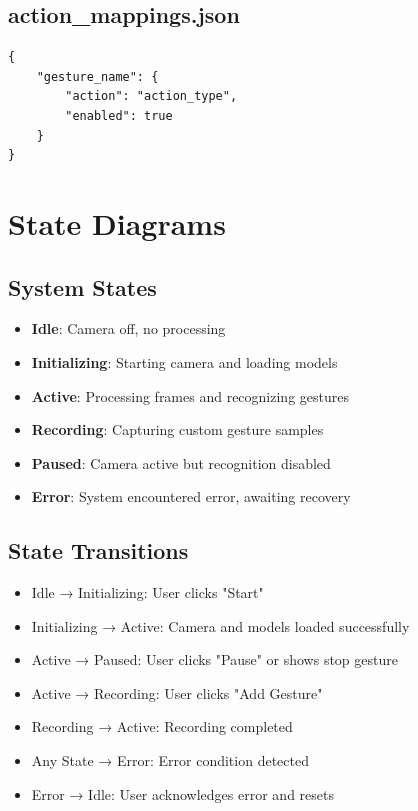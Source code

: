 \documentclass[12pt,a4paper]{report}
\begin{document}
\subsection{action\_mappings.json}
\begin{verbatim}
{
    "gesture_name": {
        "action": "action_type",
        "enabled": true
    }
}
\end{verbatim}

\section{State Diagrams}

\subsection{System States}

\begin{itemize}
    \item \textbf{Idle}: Camera off, no processing
    \item \textbf{Initializing}: Starting camera and loading models
    \item \textbf{Active}: Processing frames and recognizing gestures
    \item \textbf{Recording}: Capturing custom gesture samples
    \item \textbf{Paused}: Camera active but recognition disabled
    \item \textbf{Error}: System encountered error, awaiting recovery
\end{itemize}

\subsection{State Transitions}

\begin{itemize}
    \item Idle → Initializing: User clicks "Start"
    \item Initializing → Active: Camera and models loaded successfully
    \item Active → Paused: User clicks "Pause" or shows stop gesture
    \item Active → Recording: User clicks "Add Gesture"
    \item Recording → Active: Recording completed
    \item Any State → Error: Error condition detected
    \item Error → Idle: User acknowledges error and resets
\end{itemize}
\end{document}
